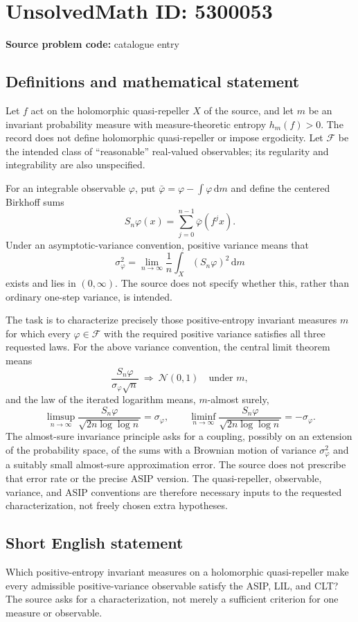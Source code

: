 \documentclass[11pt]{article}
\begin{document}
\section*{UnsolvedMath ID: 5300053}
\textbf{Source problem code:} catalogue entry
\subsection{Definitions and mathematical statement}
Let $f$ act on the holomorphic quasi-repeller $X$ of the source, and let $m$ be an invariant probability measure with measure-theoretic entropy $h_m(f)>0$. The record does not define holomorphic quasi-repeller or impose ergodicity. Let $\mathcal F$ be the intended class of ``reasonable'' real-valued observables; its regularity and integrability are also unspecified.

For an integrable observable $\varphi$, put $\bar\varphi=\varphi-\int\varphi\,\mathrm dm$ and define the centered Birkhoff sums
\[
 S_n\varphi(x)=\sum_{j=0}^{n-1}\bar\varphi(f^jx).
\]
Under an asymptotic-variance convention, positive variance means that
\[
 \sigma_\varphi^2=\lim_{n\to\infty}\frac1n\int_X(S_n\varphi)^2\,\mathrm dm
\]
exists and lies in $(0,\infty)$. The source does not specify whether this, rather than ordinary one-step variance, is intended.

The task is to characterize precisely those positive-entropy invariant measures $m$ for which every $\varphi\in\mathcal F$ with the required positive variance satisfies all three requested laws. For the above variance convention, the central limit theorem means
\[
 \frac{S_n\varphi}{\sigma_\varphi\sqrt n}
       \ \Longrightarrow\ \mathcal N(0,1)
 \quad\text{under }m,
\]
and the law of the iterated logarithm means, $m$-almost surely,
\[
 \limsup_{n\to\infty}\frac{S_n\varphi}{\sqrt{2n\log\log n}}=\sigma_\varphi,
 \qquad
 \liminf_{n\to\infty}\frac{S_n\varphi}{\sqrt{2n\log\log n}}=-\sigma_\varphi.
\]
The almost-sure invariance principle asks for a coupling, possibly on an extension of the probability space, of the sums with a Brownian motion of variance $\sigma_\varphi^2$ and a suitably small almost-sure approximation error. The source does not prescribe that error rate or the precise ASIP version. The quasi-repeller, observable, variance, and ASIP conventions are therefore necessary inputs to the requested characterization, not freely chosen extra hypotheses.
\subsection{Short English statement}
Which positive-entropy invariant measures on a holomorphic quasi-repeller make every admissible positive-variance observable satisfy the ASIP, LIL, and CLT? The source asks for a characterization, not merely a sufficient criterion for one measure or observable.
\end{document}
